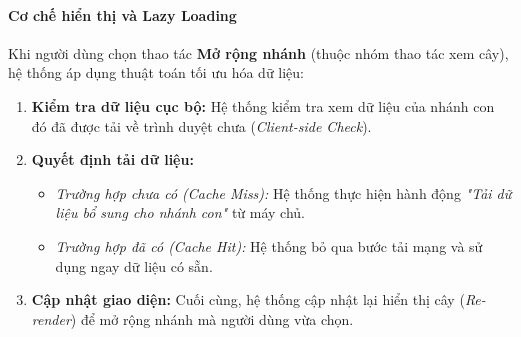 \paragraph{Cơ chế hiển thị và Lazy Loading}
Khi người dùng chọn thao tác \textbf{Mở rộng nhánh} (thuộc nhóm thao tác xem cây), hệ thống áp dụng thuật toán tối ưu hóa dữ liệu:
\begin{enumerate}
    \item \textbf{Kiểm tra dữ liệu cục bộ:} Hệ thống kiểm tra xem dữ liệu của nhánh con đó đã được tải về trình duyệt chưa (\textit{Client-side Check}).
    \item \textbf{Quyết định tải dữ liệu:}
    \begin{itemize}
        \item \textit{Trường hợp chưa có (Cache Miss):} Hệ thống thực hiện hành động \textit{"Tải dữ liệu bổ sung cho nhánh con"} từ máy chủ.
        \item \textit{Trường hợp đã có (Cache Hit):} Hệ thống bỏ qua bước tải mạng và sử dụng ngay dữ liệu có sẵn.
    \end{itemize}
    \item \textbf{Cập nhật giao diện:} Cuối cùng, hệ thống cập nhật lại hiển thị cây (\textit{Re-render}) để mở rộng nhánh mà người dùng vừa chọn.
\end{enumerate}
